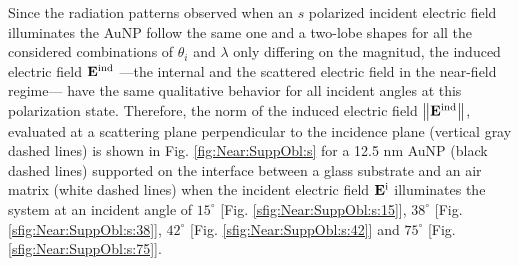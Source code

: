 Since the radiation patterns observed when an $s$ polarized incident electric field illuminates the AuNP follow the same one and a two-lobe shapes for all the considered combinations of $\theta_i$ and $\lambda$ only differing on the magnitud, the induced electric field $\vb{E}^\text{ind}$ ---the internal and the scattered electric field in the near-field regime--- have the same qualitative behavior for all incident angles at this polarization state. Therefore, the norm of the induced electric field $\norm{\vb{E}^\text{ind}}$, evaluated at a scattering plane perpendicular to the incidence plane (vertical gray dashed lines) is shown in Fig. \ref{fig:Near:SuppObl:s} for a 12.5 nm AuNP (black dashed lines) supported on the interface between a glass substrate and an air matrix (white dashed lines) when the incident electric field $\vb{E}^\text{i}$ illuminates the system at an incident angle of $15^\circ$ [Fig. \ref{sfig:Near:SuppObl:s:15}], $38^\circ$ [Fig. \ref{sfig:Near:SuppObl:s:38}], $42^\circ$ [Fig. \ref{sfig:Near:SuppObl:s:42}]  and $75^\circ$ [Fig. \ref{sfig:Near:SuppObl:s:75}].

